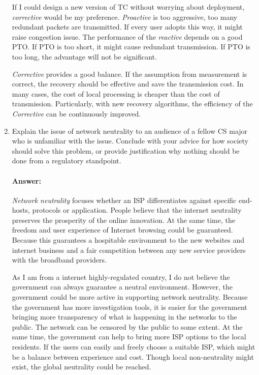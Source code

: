 \documentclass[a4paper,11pt]{article}
\theoremstyle{mytheor}
\begin{document}
\begin{enumerate}
If I could design a new version of TC without worrying about deployment, 
\emph{corrective} would be my preference.
\emph{Proactive} is too aggressive, too many redundant packets are transmitted.
If every user adopts this way, it might raise congestion issue.
The performance of the \emph{reactive} depends on a good PTO.
If PTO is too short, it might cause redundant transmission.
If PTO is too long, the advantage will not be significant.

\emph{Corrective} provides a good balance.
If the assumption from measurement is correct, the recovery should be effective and save the transmission cost.
In many cases, the cost of local processing is cheaper than the cost of transmission.
Particularly, with new recovery algorithms, the efficiency of the \emph{Corrective} can be continuously improved.


\item
Explain the issue of network neutrality to an audience of a fellow CS major who is unfamiliar with the issue.
Conclude with your advice for how society should solve this problem, or provide justification why nothing should be done from a regulatory standpoint.
\paragraph{Answer:}
\emph{Network neutrality} focuses whether an ISP differentiates against specific end-hosts, protocols or application.
People believe that the internet neutrality preserves the prosperity of the online innovation.
At the same time, the freedom and user experience of Internet browsing could be guaranteed. 
Because this guarantees a hospitable environment to the new websites and internet business and a fair competition between any new service providers with the broadband providers.

As I am from a internet highly-regulated country, I do not believe the government can always guarantee a neutral environment.
However, the government could be more active in supporting network neutrality.
Because the government has more investigation tools, it is easier for the government bringing more transparency of what is happening in the networks to the public.
The network can be censored by the public to some extent.
At the same time, the government can help to bring more ISP options to the local residents.
If the users can easily and freely choose a suitable ISP, which might be a balance between experience and cost.
Though local non-neutrality might exist, the global neutrality could be reached.


\end{enumerate}
\end{document}
